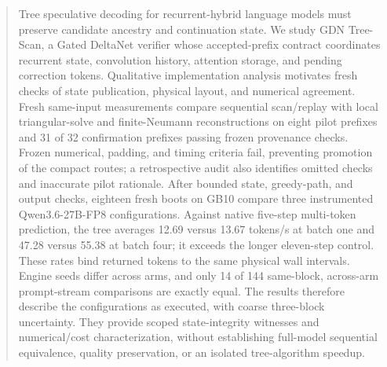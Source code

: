 \begin{abstract}
Tree speculative decoding for recurrent-hybrid language models must preserve candidate ancestry and continuation state. We study GDN Tree-Scan, a Gated DeltaNet verifier whose accepted-prefix contract coordinates recurrent state, convolution history, attention storage, and pending correction tokens. Qualitative implementation analysis motivates fresh checks of state publication, physical layout, and numerical agreement. Fresh same-input measurements compare sequential scan/replay with local triangular-solve and finite-Neumann reconstructions on eight pilot prefixes and 31 of 32 confirmation prefixes passing frozen provenance checks. Frozen numerical, padding, and timing criteria fail, preventing promotion of the compact routes; a retrospective audit also identifies omitted checks and inaccurate pilot rationale. After bounded state, greedy-path, and output checks, eighteen fresh boots on GB10 compare three instrumented Qwen3.6-27B-FP8 configurations. Against native five-step multi-token prediction, the tree averages 12.69 versus 13.67 tokens/s at batch one and 47.28 versus 55.38 at batch four; it exceeds the longer eleven-step control. These rates bind returned tokens to the same physical wall intervals. Engine seeds differ across arms, and only 14 of 144 same-block, across-arm prompt-stream comparisons are exactly equal. The results therefore describe the configurations as executed, with coarse three-block uncertainty. They provide scoped state-integrity witnesses and numerical/cost characterization, without establishing full-model sequential equivalence, quality preservation, or an isolated tree-algorithm speedup.
\end{abstract}
